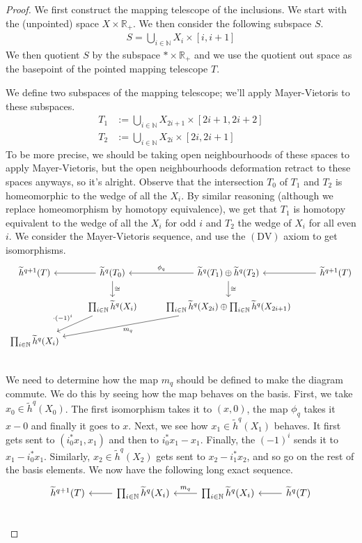 \documentclass[12pt, notitlepage]{article}
\theoremstyle{definition}
\newcommand{\redco}{\widetilde{h}}
\begin{document}
\begin{proof}
  We first construct the mapping telescope of the inclusions. We start with the (unpointed) space
  $X \times \mathbb{R}_+$.  We then consider the following subspace $S$.
  \begin{align*}
    S = \bigcup_{i \in \mathbb{N}} X_i \times [i,i+1]
  \end{align*}
  We then quotient $S$ by the subspace ${\ast} \times \mathbb{R}_+$ and we use the quotient out
  space as the basepoint of the pointed mapping telescope $T$.

  We define two subspaces of the mapping telescope; we'll apply Mayer-Vietoris to these subspaces.
  \begin{align*}
    T_1 &:= \bigcup_{i \in \mathbb{N}} X_{2i+1} \times [2i+1, 2i+2] \\
    T_2 &:= \bigcup_{i \in \mathbb{N}} X_{2i} \times [2i, 2i+1] 
  \end{align*}
  To be more precise, we should be taking open neighbourhoods of these spaces to apply
  Mayer-Vietoris, but the open neighbourhoods deformation retract to these spaces anyways, so it's
  alright.  Observe that the intersection $T_0$ of $T_1$ and $T_2$ is homeomorphic to the wedge of
  all the $X_i$.  By similar reasoning (although we replace homeomorphism by homotopy equivalence),
  we get that $T_1$ is homotopy equivalent to the wedge of all the $X_i$ for odd $i$ and $T_2$ the
  wedge of $X_i$ for all even $i$. We consider the Mayer-Vietoris sequence, and use the
  $(\mathrm{DV})$ axiom to get isomorphisms.
  \[
    \begin{tikzcd}
      \redco^{q+1}(T) & \redco^{q}(T_0) \ar[l] \ar[d, "\cong"] & \redco^{q}(T_1) \oplus \redco^{q}(T_2) \ar[l, swap, "\phi_q"] \ar[d, "\cong"] & \redco^{q+1}(T) \ar[l] \\
      & \prod_{i \in \mathbb{N}} \redco^{q}(X_i) \ar[dl, swap, "\cdot (-1)^i"] & \prod_{i \in \mathbb{N}} \redco^{q}(X_{2i}) \oplus \prod_{i \in \mathbb{N}} \redco^{q}(X_{2i+1}) \ar[dll, "m_q"] &   \\
      \prod_{i \in \mathbb{N}} \redco^{q}(X_i) & & & \\
    \end{tikzcd}
  \]
  We need to determine how the map $m_q$ should be defined to make the diagram commute.  We do this
  by seeing how the map behaves on the basis. First, we take $x_0 \in \redco^{q}(X_0)$. The first
  isomorphism takes it to $(x, 0)$, the map $\phi_q$ takes it $x-0$ and finally it goes to
  $x$. Next, we see how $x_1 \in \redco^{q}(X_1)$ behaves. It first gets sent to
  $(i_0^{\ast}x_1, x_1)$ and then to $i_0^{\ast}x_1 - x_1$.  Finally, the $(-1)^i$ sends it to
  $x_1 - i_0^{\ast}x_1$. Similarly, $x_2 \in \redco^{q}(X_2)$ gets sent to $x_2-i_1^{\ast}x_2$, and
  so go on the rest of the basis elements. We now have the following long exact sequence.
  \[
    \begin{tikzcd}
      \redco^{q+1}(T) & \prod_{i \in \mathbb{N}}\redco^{q} (X_i) \ar[l] & \prod_{i \in \mathbb{N}}\redco^{q} (X_i) \ar[swap, l, "m_q"] & \redco^{q}(T) \ar[l] \\
    \end{tikzcd}
  \]


\end{proof}
\end{document}
